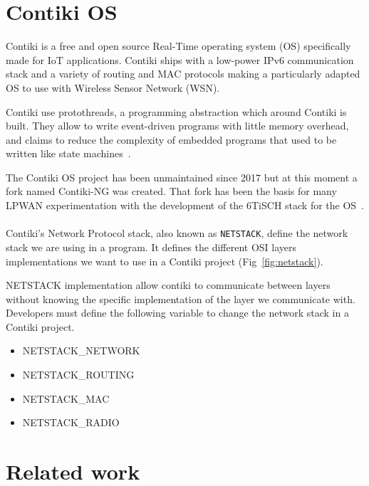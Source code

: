 \section{Contiki OS}

Contiki is a free and open source Real-Time operating system (OS) specifically made
for IoT applications. Contiki ships with a low-power IPv6 communication stack
and a variety of routing and MAC protocols making a particularly adapted OS to
use with Wireless Sensor Network (WSN).

Contiki use protothreads, a programming abstraction which around Contiki is
built.
They allow to write event-driven programs with little memory overhead, and
claims to reduce the complexity of embedded programs that used to be written 
like state machines~\cite{10.1145/1182807.1182811}.

The Contiki OS project has been unmaintained since 2017 but at this moment a
fork named Contiki-NG was created.
That fork has been the basis for many LPWAN experimentation with the
development of the 6TiSCH stack for the OS~\cite{Duquennoy2017TSCHA6}.

\paragraph{}

Contiki's Network Protocol stack, also known as \lstinline{NETSTACK}, define
the network stack we are using in a program.
It defines the different OSI layers implementations we 
want to use in a Contiki project (Fig~\ref{fig:netstack}).

NETSTACK implementation allow contiki to communicate between layers without 
knowing the specific implementation of the layer we communicate with.
Developers must define the following variable to change the network stack 
in a Contiki project.

\begin{itemize}
  \item NETSTACK\_NETWORK
  \item NETSTACK\_ROUTING
  \item NETSTACK\_MAC
  \item NETSTACK\_RADIO
\end{itemize}



\section{Related work}

